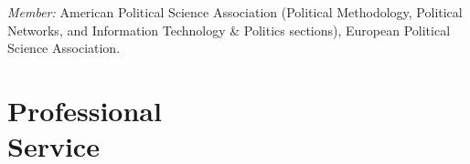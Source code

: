 \documentclass[margin,line,11pt]{resume}
\newcommand{\nl}{\vspace{0.10in}\\}
\begin{document}
\begin{resume}
\emph{Member:} American Political Science Association (Political Methodology, Political Networks, and Information Technology \& Politics sections), European Political Science Association.


   
    
    

    
   
    


\section{\mysidestyle Professional\\Service}


\end{resume}
\end{document}
